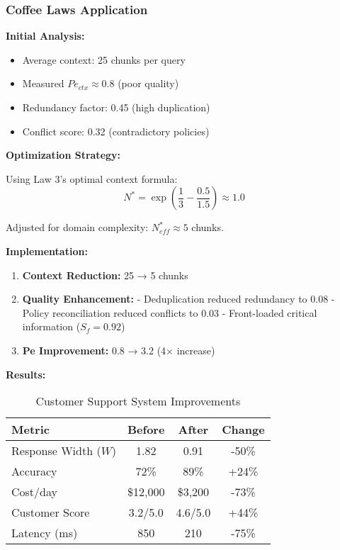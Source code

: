 \documentclass[conference]{IEEEtran}
\begin{document}
\subsubsection{Coffee Laws Application}

\textbf{Initial Analysis:}
\begin{itemize}
\item Average context: 25 chunks per query
\item Measured $Pe_{ctx} \approx 0.8$ (poor quality)
\item Redundancy factor: 0.45 (high duplication)
\item Conflict score: 0.32 (contradictory policies)
\end{itemize}

\textbf{Optimization Strategy:}

Using Law 3's optimal context formula:
\begin{equation}
N^* = \exp\left(\frac{1}{3} - \frac{0.5}{1.5}\right) \approx 1.0
\end{equation}

Adjusted for domain complexity: $N_{eff}^* \approx 5$ chunks.

\textbf{Implementation:}
\begin{enumerate}
\item \textbf{Context Reduction:} 25 → 5 chunks
\item \textbf{Quality Enhancement:}
   - Deduplication reduced redundancy to 0.08
   - Policy reconciliation reduced conflicts to 0.03
   - Front-loaded critical information ($S_f = 0.92$)
\item \textbf{Pe Improvement:} 0.8 → 3.2 (4× increase)
\end{enumerate}

\textbf{Results:}

\begin{table}[h]
\centering
\caption{Customer Support System Improvements}
\begin{tabular}{@{}lccc@{}}
\toprule
Metric & Before & After & Change \\
\midrule
Response Width ($W$) & 1.82 & 0.91 & -50\% \\
Accuracy & 72\% & 89\% & +24\% \\
Cost/day & \$12,000 & \$3,200 & -73\% \\
Customer Score & 3.2/5.0 & 4.6/5.0 & +44\% \\
Latency (ms) & 850 & 210 & -75\% \\
\bottomrule
\end{tabular}
\end{table}
\end{document}
